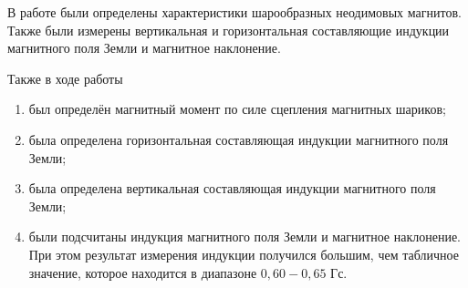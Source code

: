 \documentclass[a4paper]{article}
\theoremstyle{definition}
\theoremstyle{remark}
\begin{document}
В работе были определены характеристики шарообразных неодимовых магнитов. Также были измерены вертикальная и горизонтальная составляющие индукции магнитного поля Земли и магнитное наклонение.

\medskip

Также в ходе работы

\begin{enumerate}
    \item был определён магнитный момент по силе сцепления магнитных шариков;
    \item была определена горизонтальная составляющая индукции магнитного поля Земли;
    \item была определена вертикальная составляющая индукции магнитного поля Земли;
    \item были подсчитаны индукция магнитного поля Земли и магнитное наклонение. При этом результат измерения индукции получился большим, чем табличное значение, которое находится в диапазоне $0,60-0,65$ Гс.
\end{enumerate}
 
\end{document}
